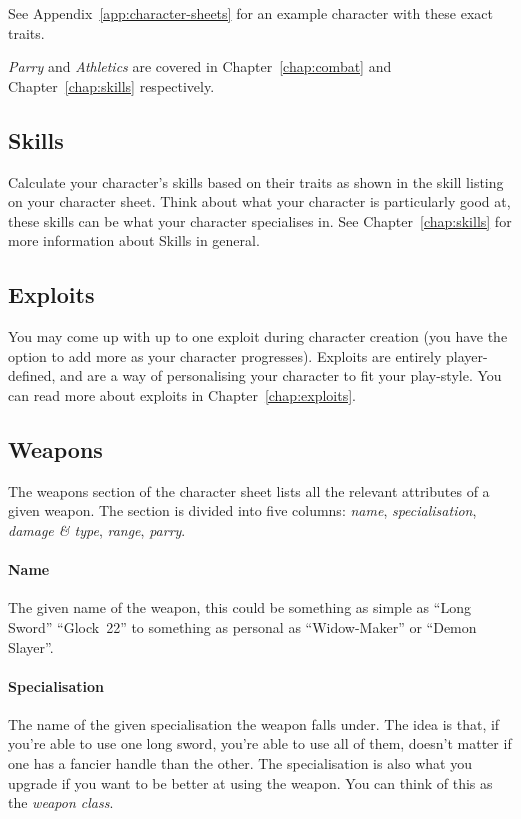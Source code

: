 See Appendix~\ref{app:character-sheets} for an example character with these exact traits.

\note \textit{Parry} and \textit{Athletics} are covered in Chapter~\ref{chap:combat} and Chapter~\ref{chap:skills} respectively.

\subsection{Skills}
Calculate your character's skills based on their traits as shown in the skill listing on your character sheet.
Think about what your character is particularly good at, these skills can be what your character specialises in.
See Chapter~\ref{chap:skills} for more information about Skills in general.

\subsection{Exploits}
You may come up with up to one exploit during character creation (you have the option to add more as your character progresses).
Exploits are entirely player-defined, and are a way of personalising your character to fit your play-style.
You can read more about exploits in Chapter~\ref{chap:exploits}.

\subsection{Weapons}
The weapons section of the character sheet lists all the relevant attributes of a given weapon.
The section is divided into five columns: \textit{name}, \textit{specialisation}, \textit{damage \& type}, \textit{range}, \textit{parry}.

\paragraph{Name} The given name of the weapon, this could be something as simple as ``Long Sword'' ``Glock~22'' to something as personal as ``Widow-Maker'' or ``Demon Slayer''.

\paragraph{Specialisation} The name of the given specialisation the weapon falls under.
The idea is that, if you're able to use one long sword, you're able to use all of them, doesn't matter if one has a fancier handle than the other. 
The specialisation is also what you upgrade if you want to be better at using the weapon.
You can think of this as the \textit{weapon class}.

